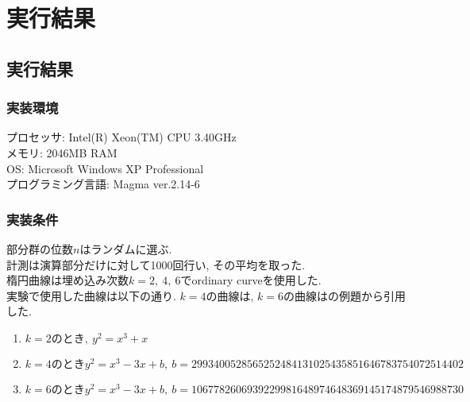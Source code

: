 \chapter{実行結果}
\section{実行結果}
\subsection{実装環境}
\noindent プロセッサ: Intel(R) Xeon(TM) CPU 3.40GHz\\
メモリ: 2046MB RAM\\
OS: Microsoft Windows XP Professional\\
プログラミング言語: Magma ver.2.14-6

\subsection{実装条件}
\noindent
部分群の位数$n$はランダムに選ぶ. \\
計測は演算部分だけに対して1000回行い, その平均を取った. \\
楕円曲線は埋め込み次数$k=2,\ 4,\ 6$でordinary curveを使用した. \\
実験で使用した曲線は以下の通り. $k=4$の曲線は\cite{OPM}, $k=6$の曲線は\cite{GMM}の例題から引用した. 
\begin{enumerate}
\item $k=2のとき,\ y^2=x^3+x$\\
\item $k=4のときy^2 = x^3 - 3x + b,\ b=2993400528565252484131025435851646783754072514402$\\
\item $k=6のときy^2 = x^3 - 3x + b,\ b=1067782606939229981648974648369145174879546988730$\\
\end{enumerate}
\clearpage
